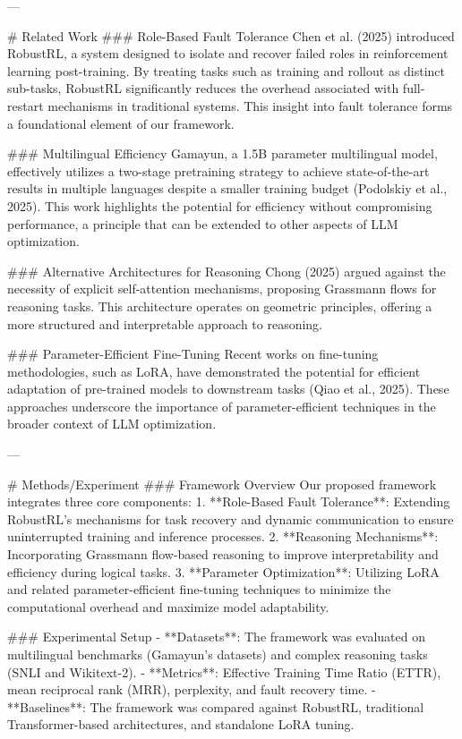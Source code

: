 ---

# Related Work  
### Role-Based Fault Tolerance  
Chen et al. (2025) introduced RobustRL, a system designed to isolate and recover failed roles in reinforcement learning post-training. By treating tasks such as training and rollout as distinct sub-tasks, RobustRL significantly reduces the overhead associated with full-restart mechanisms in traditional systems. This insight into fault tolerance forms a foundational element of our framework.

### Multilingual Efficiency  
Gamayun, a 1.5B parameter multilingual model, effectively utilizes a two-stage pretraining strategy to achieve state-of-the-art results in multiple languages despite a smaller training budget (Podolskiy et al., 2025). This work highlights the potential for efficiency without compromising performance, a principle that can be extended to other aspects of LLM optimization.

### Alternative Architectures for Reasoning  
Chong (2025) argued against the necessity of explicit self-attention mechanisms, proposing Grassmann flows for reasoning tasks. This architecture operates on geometric principles, offering a more structured and interpretable approach to reasoning.

### Parameter-Efficient Fine-Tuning  
Recent works on fine-tuning methodologies, such as LoRA, have demonstrated the potential for efficient adaptation of pre-trained models to downstream tasks (Qiao et al., 2025). These approaches underscore the importance of parameter-efficient techniques in the broader context of LLM optimization.

---

# Methods/Experiment  
### Framework Overview  
Our proposed framework integrates three core components:  
1. **Role-Based Fault Tolerance**: Extending RobustRL's mechanisms for task recovery and dynamic communication to ensure uninterrupted training and inference processes.  
2. **Reasoning Mechanisms**: Incorporating Grassmann flow-based reasoning to improve interpretability and efficiency during logical tasks.  
3. **Parameter Optimization**: Utilizing LoRA and related parameter-efficient fine-tuning techniques to minimize the computational overhead and maximize model adaptability.

### Experimental Setup  
- **Datasets**: The framework was evaluated on multilingual benchmarks (Gamayun's datasets) and complex reasoning tasks (SNLI and Wikitext-2).  
- **Metrics**: Effective Training Time Ratio (ETTR), mean reciprocal rank (MRR), perplexity, and fault recovery time.  
- **Baselines**: The framework was compared against RobustRL, traditional Transformer-based architectures, and standalone LoRA tuning.  

